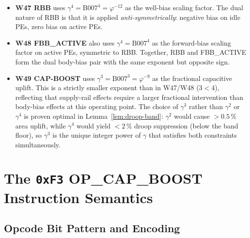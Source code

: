 \documentclass[12pt,a4paper]{report}
\theoremstyle{plain}
\theoremstyle{definition}
\theoremstyle{remark}
\newcommand{\Bseven}{\mathrm{B007}}
\begin{document}
\begin{itemize}[leftmargin=1.5em]
  \item \textbf{W47 RBB} uses $\gamma^{4} = \Bseven^{4} = \varphi^{-12}$
    as the well-bias scaling factor.
    The dual nature of RBB is that it is applied \emph{anti-symmetrically}:
    negative bias on idle PEs, zero bias on active PEs.
  \item \textbf{W48 FBB\_ACTIVE} also uses $\gamma^{4} = \Bseven^{4}$
    as the forward-bias scaling factor on active PEs, symmetric to RBB.
    Together, RBB and FBB\_ACTIVE form the dual body-bias pair with the
    same exponent but opposite sign.
  \item \textbf{W49 CAP-BOOST} uses $\gamma^{3} = \Bseven^{3} = \varphi^{-9}$
    as the fractional capacitive uplift.
    This is a strictly smaller exponent than in W47/W48 ($3 < 4$),
    reflecting that supply-rail effects require a larger fractional intervention
    than body-bias effects at this operating point.
    The choice of $\gamma^{3}$ rather than $\gamma^{2}$ or $\gamma^{4}$ is
    proven optimal in Lemma~\ref{lem:droop-band}: $\gamma^{2}$ would cause
    $> 0.5\,\%$ area uplift, while $\gamma^{4}$ would yield $< 2\,\%$ droop
    suppression (below the band floor), so $\gamma^{3}$ is the unique
    integer power of $\gamma$ that satisfies both constraints simultaneously.
\end{itemize}

\section{The \texttt{0xF3} OP\_CAP\_BOOST Instruction Semantics}
\label{sec:opcode-semantics}

\subsection{Opcode Bit Pattern and Encoding}
\label{ssec:opcode-bit-pattern}
\end{document}
